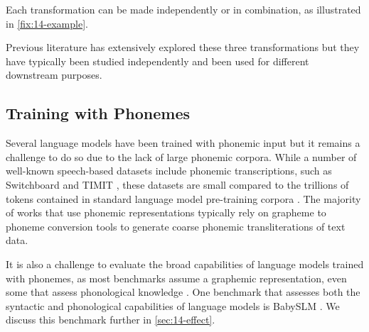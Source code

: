 


\noindent
Each transformation can be made independently or in combination, as illustrated in \cref{fix:14-example}. %

Previous literature has extensively explored these three transformations but they have typically been studied independently and been used for different downstream purposes. 

\subsection{Training with Phonemes}

Several language models have been trained with phonemic input \citep{sundararaman-2021-phonemebert, gale-etal-2023-bort} but it remains a challenge to do so due to the lack of large phonemic corpora. While a number of well-known speech-based datasets include phonemic transcriptions, such as Switchboard \citep{godfrey1992switchboard} and TIMIT \citep{garofolo1993darpa}, these datasets are small compared to the trillions of tokens contained in standard language model pre-training corpora \citep{elazar-2024-redpajama}. The majority of works that use phonemic representations typically rely on grapheme to phoneme conversion tools \citep{bisani-2008-g2p, hasegawa-2020-g2pmultilingual} to generate coarse phonemic transliterations of text data.

It is also a challenge to evaluate the broad capabilities of language models trained with phonemes, as most benchmarks assume a graphemic representation, even some that assess phonological knowledge \citep{suvarna-etal-2024-phonologybench}. One benchmark that assesses both the syntactic and phonological capabilities of language models is BabySLM \citep{lavechin}. %
We discuss this benchmark further in \cref{sec:14-effect}.

